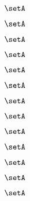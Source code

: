 \begin{forslides}
    \begin{equation}
        \label{eq:slides-processes-83}
        \setA
    \end{equation}

    \begin{equation}
        \label{eq:slides-processes-84}
        \setA
    \end{equation}

    \begin{equation}
        \label{eq:slides-processes-85}
        \setA
    \end{equation}

    \begin{equation}
        \label{eq:slides-processes-86}
        \setA
    \end{equation}

    \begin{equation}
        \label{eq:slides-processes-87}
        \setA
    \end{equation}

    \begin{equation}
        \label{eq:slides-processes-88}
        \setA
    \end{equation}

    \begin{equation}
        \label{eq:slides-processes-89}
        \setA
    \end{equation}

    \begin{equation}
        \label{eq:slides-processes-90}
        \setA
    \end{equation}

    \begin{equation}
        \label{eq:slides-processes-91}
        \setA
    \end{equation}

    \begin{equation}
        \label{eq:slides-processes-92}
        \setA
    \end{equation}

    \begin{equation}
        \label{eq:slides-processes-93}
        \setA
    \end{equation}

    \begin{equation}
        \label{eq:slides-processes-94}
        \setA
    \end{equation}

    \begin{equation}
        \label{eq:slides-processes-95}
        \setA
    \end{equation}


\end{forslides}
